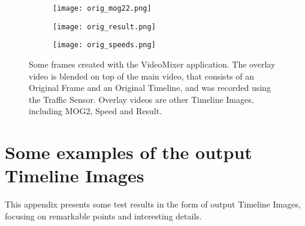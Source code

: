 \begin{figure}[!h]
	\centering
	\begin{subfigure}[t]{0.6\textwidth}
		\texttt{[image: orig\_mog22.png]}
		\vspace{0.3cm}
	\end{subfigure}
	\begin{subfigure}[t]{0.6\textwidth}
		\texttt{[image: orig\_result.png]}
		\vspace{0.3cm}
	\end{subfigure}
	
	\begin{subfigure}[t]{0.6\textwidth}
		\texttt{[image: orig\_speeds.png]}
	\end{subfigure}

	\caption[Some frames from the VideoMixer application]{Some frames created with the VideoMixer application. The overlay video is blended on top of the main video, that consists of an Original Frame and an Original Timeline, and was recorded using the Traffic Sensor. Overlay videos are other Timeline Images, including MOG2, Speed and Result.\label{fig:video_mixer_frames}}
\end{figure}

\clearpage\section{Some examples of the output Timeline Images}\label{app:TIs}
This appendix presents some test results in the form of output Timeline Images, focusing on remarkable points and interesting details.

